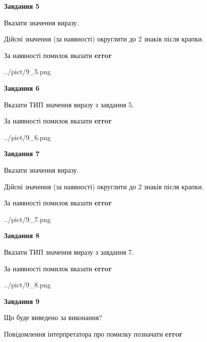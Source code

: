 \documentclass[11pt, ukrainian]{article}
\begin{document}
{\begin {large}
{\begin {center}\textbf{Завдання 5}\end {center}}\par
Вказати значення виразу. \par
Дійсні значення (за наявності) округлити до 2 знаків після крапки. \par
За наявності помилок вказати \textbf{error}

\begin{center}
	{../pict/9_5.png}
\end{center}
\newpage

{\begin {center}\textbf{Завдання 6}\end {center}}\par
Вказати ТИП значення виразу з завдання 5. \par
За наявності помилок вказати \textbf{error}

\begin{center}
	{../pict/9_6.png}
\end{center}
\newpage

{\begin {center}\textbf{Завдання 7}\end {center}}\par
Вказати значення виразу. \par
Дійсні значення (за наявності) округлити до 2 знаків після крапки. \par
За наявності помилок вказати \textbf{error}

\begin{center}
	{../pict/9_7.png}
\end{center}
\newpage

{\begin {center}\textbf{Завдання 8}\end {center}}\par
Вказати ТИП значення виразу з завдання 7. \par
За наявності помилок вказати \textbf{error}

\begin{center}
	{../pict/9_8.png}
\end{center}
\newpage

{\begin {center}\textbf{Завдання 9}\end {center}}\par
Що буде виведено за виконання? \par
Повідомлення інтерпретатора про помилку позначати \textbf{error}


\end{large}}
\end{document}
